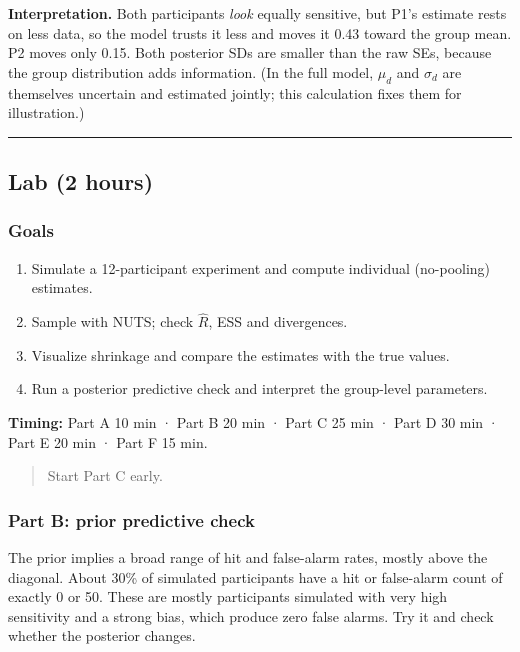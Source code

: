 \textbf{Interpretation.} Both participants \emph{look} equally
sensitive, but P1's estimate rests on less data, so the model trusts it
less and moves it 0.43 toward the group mean. P2 moves only 0.15. Both
posterior SDs are smaller than the raw SEs, because the group
distribution adds information. (In the full model, \(\mu_d\) and
\(\sigma_d\) are themselves uncertain and estimated jointly; this
calculation fixes them for illustration.)

\begin{center}\rule{0.5\linewidth}{0.5pt}\end{center}


\subsection{Lab (2 hours)}

\subsubsection{Goals}

\begin{enumerate}
\def\labelenumi{\arabic{enumi}.}
\tightlist
\item
  Simulate a 12-participant experiment and compute individual
  (no-pooling) estimates.
\item
  Sample with NUTS; check \(\hat R\), ESS and divergences.
\item
  Visualize shrinkage and compare the estimates with the true values.
\item
  Run a posterior predictive check and interpret the group-level
  parameters.
\end{enumerate}

\textbf{Timing:} Part A 10 min · Part B 20 min · Part C 25 min · Part D
30 min · Part E 20 min · Part F 15 min.

\begin{quote}
Start Part C early.
\end{quote}

\subsubsection{Part B: prior predictive check}

The prior implies a broad range of hit and false-alarm rates, mostly
above the diagonal. About 30\% of simulated participants have a hit or
false-alarm count of exactly 0 or 50. These are mostly participants
simulated with very high sensitivity and a strong bias, which produce
zero false alarms. Try it and check whether the posterior changes.

